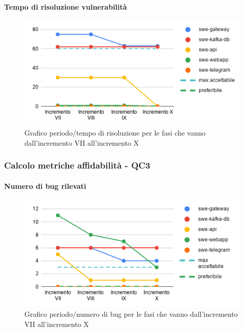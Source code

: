 \paragraph{Tempo di risoluzione vulnerabilità}
\begin{figure}[H]
			\centering
			\includegraphics[width=0.8\linewidth]{./res/images/QM-PROD-5-TVUL.png}
			\caption{Grafico periodo/tempo di risoluzione per le fasi che vanno dall'incremento VII all'incremento X}
			\label{fig:Grafico periodo/tempo di risoluzione per le fasi che vanno dall'incremento VII all'incremento X}
	\end{figure}

\subsubsection{Calcolo metriche affidabilità - QC3}
\paragraph{Numero di bug rilevati}
\begin{figure}[H]
			\centering
			\includegraphics[width=0.8\linewidth]{./res/images/QM-PROD-6-NBUG.png}
			\caption{Grafico periodo/numero di bug per le fasi che vanno dall'incremento VII all'incremento X}
			\label{fig:Grafico periodo/numero di bug  per le fasi che vanno dall'incremento VII all'incremento X}
	\end{figure}
